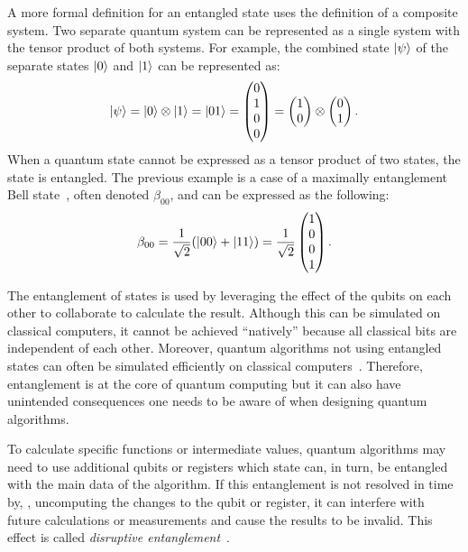 A more formal definition for an entangled state uses the definition of a composite system. Two separate quantum system can be represented as a single system with the tensor product of both systems. For example, the combined state $\ket{\psi}$ of the separate states $\ket{0}$ and $\ket{1}$ can be represented as:
\begin{equation*}
    \ket{\psi} 
    = \ket{0} \otimes \ket{1} 
    = \ket{01} 
    = \begin{pmatrix}
        0 \\    
        1 \\    
        0 \\    
        0     
    \end{pmatrix}
    = \begin{pmatrix}
        1 \\ 0
    \end{pmatrix} \otimes 
    \begin{pmatrix}
        0 \\ 1
    \end{pmatrix}.
\end{equation*} 
When a quantum state cannot be expressed as a tensor product of two states, the state is entangled. The previous example is a case of a maximally entanglement Bell state~\cite{DiCh20, MHH19}, often denoted $\beta_{00}$, and can be expressed as the following:
\begin{equation*}
    \beta_{00} = \frac{1}{\sqrt{2}} (\ket{00} + \ket{11}) = \frac{1}{\sqrt{2}} 
    \begin{pmatrix}
        1 \\
        0 \\
        0 \\
        1    
    \end{pmatrix}.
\end{equation*}


The entanglement of states is used by leveraging the effect of the qubits on each other to collaborate to calculate the result. Although this can be simulated on classical computers, it cannot be achieved ``natively'' because all classical bits are independent of each other. Moreover, quantum algorithms not using entangled states can often be simulated efficiently on classical computers~\cite{MHH19}. Therefore, entanglement is at the core of quantum computing but it can also have unintended consequences one needs to be aware of when designing quantum algorithms.

To calculate specific functions or intermediate values, quantum algorithms may need to use additional qubits or registers which state can, in turn, be entangled with the main data of the algorithm. If this entanglement is not resolved in time by, \eg, uncomputing the changes to the qubit or register, it can interfere with future calculations or measurements and cause the results to be invalid. This effect is called \emph{disruptive entanglement}~\cite{YVC24}.  


